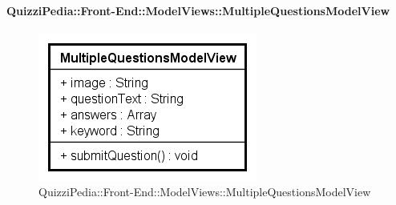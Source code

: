 \paragraph{QuizziPedia::Front-End::ModelViews::MultipleQuestionsModelView}
\begin{figure} [ht]
	\centering
	\includegraphics[scale=0.80]{UML/Classi/Front-End/QuizziPedia_Front-end_ModelView_MultipleQuestionsModelView.png}
	\caption{QuizziPedia::Front-End::ModelViews::MultipleQuestionsModelView}
\end{figure} \FloatBarrier

